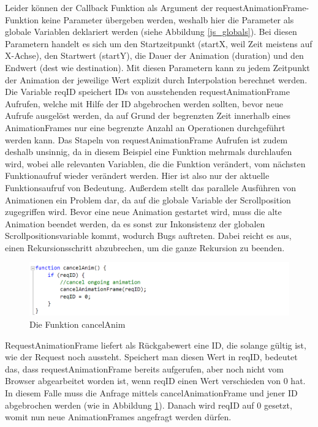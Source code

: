 Leider können der Callback Funktion als Argument der requestAnimationFrame-Funktion keine Parameter übergeben werden, weshalb hier die Parameter als globale Variablen deklariert werden (siehe Abbildung \ref{js_globals}). Bei diesen Parametern handelt es sich um den Startzeitpunkt (startX, weil Zeit meistens auf X-Achse), den Startwert (startY), die Dauer der Animation (duration) und den Endwert (dest wie destination). Mit diesen Parametern kann zu jedem Zeitpunkt der Animation der jeweilige Wert explizit durch Interpolation berechnet werden. Die Variable reqID speichert IDs von ausstehenden requestAnimationFrame Aufrufen, welche mit Hilfe der ID abgebrochen werden sollten, bevor neue Aufrufe ausgelöst werden, da auf Grund der begrenzten Zeit innerhalb eines AnimationFrames nur eine begrenzte Anzahl an Operationen durchgeführt werden kann. Das Stapeln von requestAnimationFrame Aufrufen ist zudem deshalb unsinnig, da in diesem Beispiel eine Funktion mehrmals durchlaufen wird, wobei alle relevanten Variablen, die die Funktion verändert, vom nächsten Funktionaufruf wieder verändert werden. Hier ist also nur der aktuelle Funktionsaufruf von Bedeutung. Außerdem stellt das parallele Ausführen von Animationen ein Problem dar, da auf die globale Variable der Scrollposition zugegriffen wird. Bevor eine neue Animation gestartet wird, muss die alte Animation beendet werden, da es sonst zur Inkonsistenz der globalen Scrollpositionsvariable kommt, wodurch Bugs auftreten. Dabei reicht es aus, einen Rekursionsschritt abzubrechen, um die ganze Rekursion zu beenden.

\begin{figure} [h]
\includegraphics[width=\textwidth]{./img/js_cancelanim.png}
\caption{Die Funktion cancelAnim}
\label{js_cancelanim}
\end{figure}

RequestAnimationFrame liefert als Rückgabewert eine ID, die solange gültig ist, wie der Request noch aussteht. Speichert man diesen Wert in reqID, bedeutet das, dass requestAnimationFrame bereits aufgerufen, aber noch nicht vom Browser abgearbeitet worden ist, wenn reqID einen Wert verschieden von 0 hat. In diesem Falle muss die Anfrage mittels cancelAnimationFrame und jener ID abgebrochen werden (wie in Abbildung \ref{js_cancelanim}). Danach wird reqID auf 0 gesetzt, womit nun neue AnimationFrames angefragt werden dürfen.


